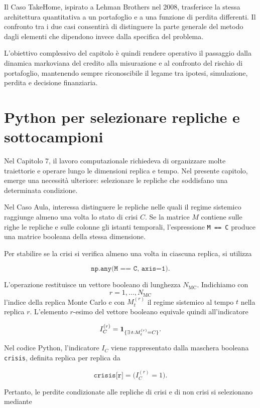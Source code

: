 Il Caso TakeHome, ispirato a Lehman Brothers nel 2008, trasferisce la stessa
architettura quantitativa a un portafoglio e a una funzione di perdita
differenti. Il confronto tra i due casi consentir\`a di distinguere la parte
generale del metodo dagli elementi che dipendono invece dalla specifica del
problema.

L'obiettivo complessivo del capitolo \`e quindi rendere operativo il
passaggio dalla dinamica markoviana del credito alla misurazione e al
confronto del rischio di portafoglio, mantenendo sempre riconoscibile il
legame tra ipotesi, simulazione, perdita e decisione finanziaria.
%


\section{Python per selezionare repliche e sottocampioni}

Nel Capitolo 7, il lavoro computazionale richiedeva di organizzare molte
traiettorie e operare lungo le dimensioni replica e tempo. Nel presente
capitolo, emerge una necessit\`a ulteriore: selezionare le repliche che
soddisfano una determinata condizione.

Nel Caso Aula, interessa distinguere le repliche nelle quali il regime
sistemico raggiunge almeno una volta lo stato di crisi $C$. Se la matrice
$M$ contiene sulle righe le repliche e sulle colonne gli istanti temporali,
l'espressione \texttt{M == C} produce una matrice booleana della stessa
dimensione.

Per stabilire se la crisi si verifica almeno una volta in ciascuna replica,
si utilizza

\[
\texttt{np.any(M == C, axis=1)}.
\]

L'operazione restituisce un vettore booleano di lunghezza
$N_{\mathrm{MC}}$. Indichiamo con
\[
r=1,\ldots,N_{\mathrm{MC}}
\]
l'indice della replica Monte Carlo e con $M_t^{(r)}$ il regime sistemico
al tempo $t$ nella replica $r$. L'elemento $r$-esimo del vettore booleano
equivale quindi all'indicatore

\[
I_C^{(r)}
=
\mathbf{1}_{\{\exists\,t:M_t^{(r)}=C\}}.
\]

Nel codice Python, l'indicatore $I_C$ viene rappresentato dalla
maschera booleana \texttt{crisis}, definita replica per replica da

\[
\texttt{crisis[r]} = \bigl(I_C^{(r)}=1\bigr).
\]

Pertanto, le perdite condizionate alle repliche di crisi e di non crisi
si selezionano mediante

